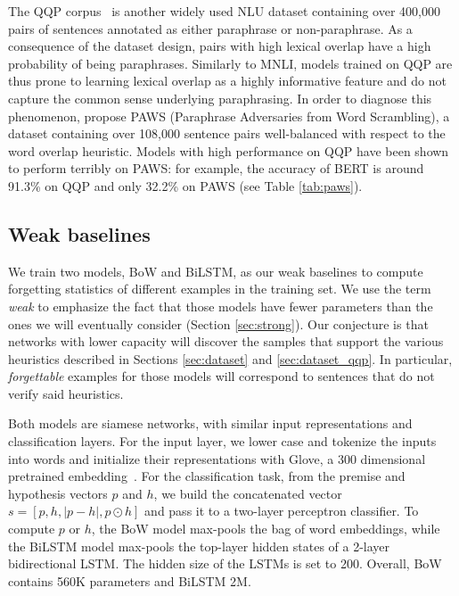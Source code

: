 The QQP corpus~\citep{qqp} is another widely used NLU dataset containing over 400,000 pairs of sentences annotated as either paraphrase or non-paraphrase. As a consequence of the dataset design, pairs with high lexical overlap have a high probability of being paraphrases. Similarly to MNLI, models trained on QQP are thus prone to learning lexical overlap as a highly informative feature and do not capture the common sense underlying paraphrasing. In order to diagnose this phenomenon, \citet{zhang-etal-2019-paws} propose PAWS (Paraphrase Adversaries from Word Scrambling), a dataset containing over 108,000 sentence pairs well-balanced with respect to the word overlap heuristic. Models with high performance on QQP have been shown to perform terribly on PAWS: for example, the accuracy of BERT is around 91.3\% on QQP and only 32.2\% on PAWS (see Table \ref{tab:paws}).

\subsection{Weak baselines}

We train two models, BoW and BiLSTM, as our weak baselines to compute forgetting statistics of different examples in the training set. We use the term \textit{weak} to emphasize the fact that those models have fewer parameters than the ones we will eventually consider (Section \ref{sec:strong}). Our conjecture is that networks with lower capacity will discover the samples that support the various heuristics described in Sections \ref{sec:dataset} and  \ref{sec:dataset_qqp}. In particular, \emph{forgettable} examples for those models will correspond to sentences that do not verify said heuristics.

Both models are siamese networks, with similar input representations and classification layers.
For the input layer, we lower case and tokenize the inputs into words and initialize their representations with Glove, a 300 dimensional pretrained embedding~\citep{pennington2014glove}.
For the classification task, from the premise and hypothesis vectors $p$ and $h$, we build the concatenated vector $s = [p, h, |p - h|, p \odot h]$ and pass it to a two-layer perceptron classifier. 
To compute $p$ or $h$, the BoW model max-pools the bag of word embeddings,
while the BiLSTM model max-pools the top-layer hidden states of a 2-layer bidirectional LSTM. The hidden size of the LSTMs is set to 200. Overall, BoW contains 560K parameters and BiLSTM 2M.


